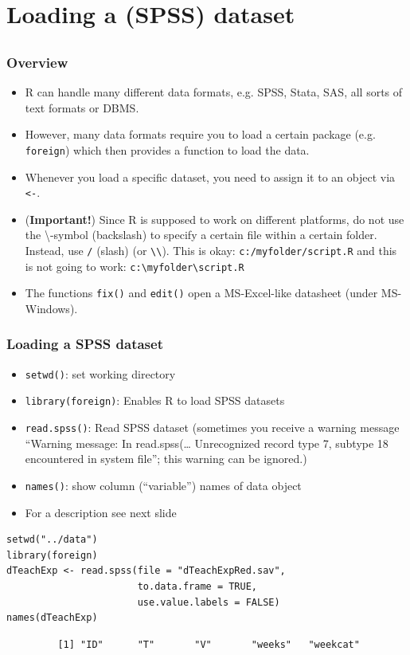 \documentclass[bigger]{beamer}
\providecommand{\alert}[1]{\textbf{#1}}
\begin{document}
\section{Loading a (SPSS) dataset}
\label{sec-3}
\subsection{}
\begin{frame}
\frametitle{Overview}
\label{sec-3-1-1}

\begin{itemize}
\item R can handle many different data formats, e.g. SPSS, Stata, SAS, all sorts of text formats or DBMS.
\item However, many data formats require you to load a certain package (e.g. \texttt{foreign}) which then provides a function to load the data.
\item Whenever you load a specific dataset, you need to assign it to an object via \texttt{<-}.
\item (\alert{Important!}) Since R is supposed to work on different platforms, do not use the
      \textbackslash-symbol (backslash) to specify a certain file within a certain
      folder. Instead, use \texttt{/} (slash) (or \texttt{\textbackslash{}\textbackslash{}}). This is okay:
      \texttt{c:/myfolder/script.R} and this is not going to work: \texttt{c:\textbackslash{}myfolder\textbackslash{}script.R}
\item The functions \texttt{fix()} and \texttt{edit()} open a MS-Excel-like datasheet (under MS-Windows).
\end{itemize}
\end{frame}
\begin{frame}[fragile,shrink = 15]
\frametitle{Loading a SPSS dataset}
\label{sec-3-1-2}

\begin{itemize}
\item \texttt{setwd()}: set working directory
\item \texttt{library(foreign)}: Enables R to load SPSS datasets
\item \texttt{read.spss()}: Read SPSS dataset (sometimes you receive a warning message
      \enquote{Warning message: In read.spss(\ldots{} Unrecognized record type 7, subtype 18
      encountered in system file}; this warning can be ignored.)
\item \texttt{names()}: show column (\enquote{variable}) names of data object
\item For a description see next slide
\end{itemize}


\lstset{language=R}
\begin{lstlisting}
setwd("../data")
library(foreign)
dTeachExp <- read.spss(file = "dTeachExpRed.sav", 
                       to.data.frame = TRUE, 
                       use.value.labels = FALSE)
names(dTeachExp)
\end{lstlisting}

\begin{verbatim}
         [1] "ID"      "T"       "V"       "weeks"   "weekcat"
\end{verbatim}
\end{frame}
\end{document}
